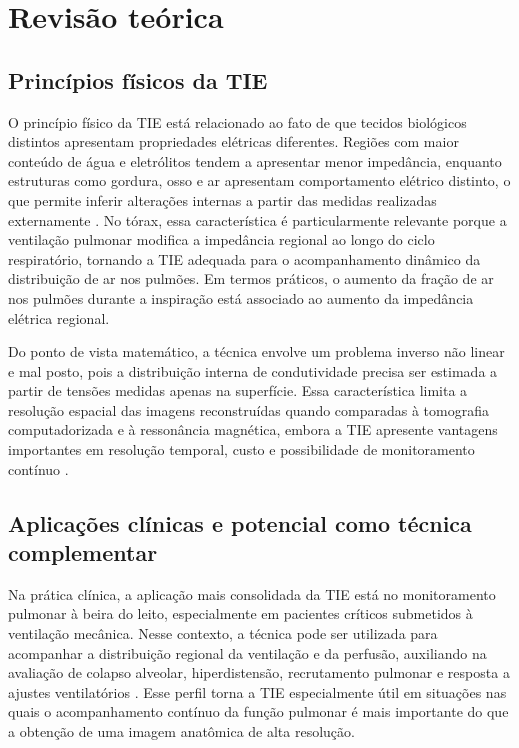 
\chapter{Revisão teórica}

\section{Princípios físicos da TIE}
\label{subsec:principios_fisicos_tie}

O princípio físico da TIE está relacionado ao fato de que tecidos biológicos distintos apresentam propriedades elétricas diferentes. Regiões com maior conteúdo de água e eletrólitos tendem a apresentar menor impedância, enquanto estruturas como gordura, osso e ar apresentam comportamento elétrico distinto, o que permite inferir alterações internas a partir das medidas realizadas externamente \cite{Lian2025}. No tórax, essa característica é particularmente relevante porque a ventilação pulmonar modifica a impedância regional ao longo do ciclo respiratório, tornando a TIE adequada para o acompanhamento dinâmico da distribuição de ar nos pulmões. Em termos práticos, o aumento da fração de ar nos pulmões durante a inspiração está associado ao aumento da impedância elétrica regional.

Do ponto de vista matemático, a técnica envolve um problema inverso não linear e mal posto, pois a distribuição interna de condutividade precisa ser estimada a partir de tensões medidas apenas na superfície. Essa característica limita a resolução espacial das imagens reconstruídas quando comparadas à tomografia computadorizada e à ressonância magnética, embora a TIE apresente vantagens importantes em resolução temporal, custo e possibilidade de monitoramento contínuo \cite{KhanLing2019}.


\section{Aplicações clínicas e potencial como técnica complementar}
\label{subsec:aplicacoes_tie}

Na prática clínica, a aplicação mais consolidada da TIE está no monitoramento pulmonar à beira do leito, especialmente em pacientes críticos submetidos à ventilação mecânica. Nesse contexto, a técnica pode ser utilizada para acompanhar a distribuição regional da ventilação e da perfusão, auxiliando na avaliação de colapso alveolar, hiperdistensão, recrutamento pulmonar e resposta a ajustes ventilatórios \cite{Scaramuzzo2024}. Esse perfil torna a TIE especialmente útil em situações nas quais o acompanhamento contínuo da função pulmonar é mais importante do que a obtenção de uma imagem anatômica de alta resolução.

